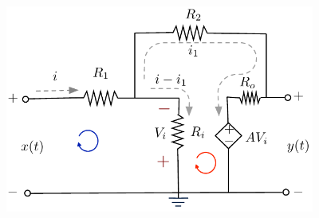 \begin{excersizelist}
\begin{solution}
{
\centering 
\captionsetup{type=figure}
\includegraphics[width=4in]{plots/multiplierbadri3.pdf}
 \label{Fig-Prob2.1c}
}


\end{solution}
\end{excersizelist}
